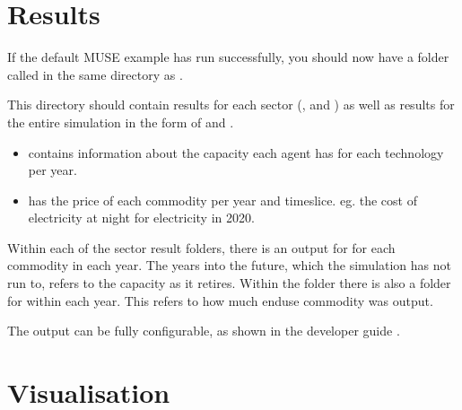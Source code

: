 \documentclass[letterpaper,10pt,english]{sphinxmanual}
\begin{document}
\section{Results}
\label{\detokenize{running-muse-example:Results}}
If the default MUSE example has run successfully, you should now have a folder called  in the same directory as .

This directory should contain results for each sector (, and ) as well as results for the entire simulation in the form of  and .
\begin{itemize}
\item {} 
 contains information about the capacity each agent has for each technology per year.

\item {} 
 has the price of each commodity per year and timeslice. eg. the cost of electricity at night for electricity in 2020.

\end{itemize}

Within each of the sector result folders, there is an output for  for each commodity in each year. The years into the future, which the simulation has not run to, refers to the capacity as it retires. Within the  folder there is also a folder for  within each year. This refers to how much end\sphinxhyphen{}use commodity was output.

The output can be fully configurable, as shown in the developer guide {\hyperref[\detokenize{advanced-guide/extending-muse::doc}]{}}.


\section{Visualisation}
\label{\detokenize{running-muse-example:Visualisation}}
{
\begin{sphinxVerbatim}[commandchars=\\\{\}]
\llap{\color{nbsphinxin}[1]:\,\hspace{\fboxrule}\hspace{\fboxsep}}   
   
   
\end{sphinxVerbatim}
}
\end{document}
